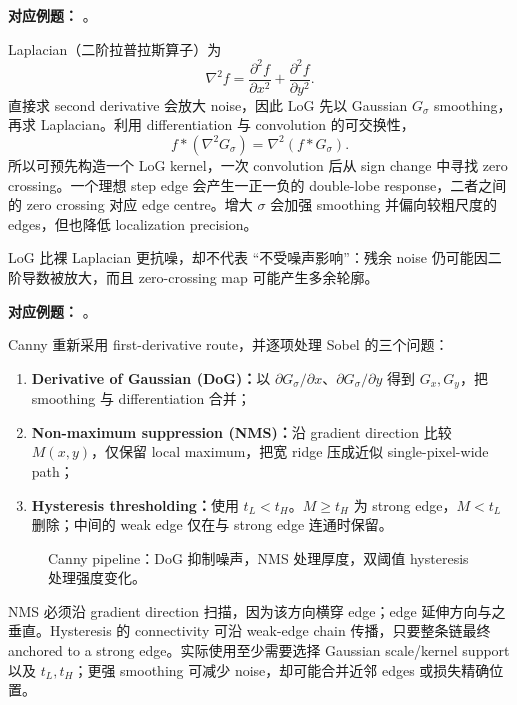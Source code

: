 \textbf{对应例题：}
。


Laplacian（二阶拉普拉斯算子）为
\[
  \nabla^2 f=\frac{\partial^2f}{\partial x^2}+\frac{\partial^2f}{\partial y^2}.
\]
直接求 second derivative 会放大 noise，因此 LoG 先以 Gaussian $G_\sigma$ smoothing，再求 Laplacian。利用 differentiation 与 convolution 的可交换性，
\[
  \boxed{f*(\nabla^2G_\sigma)=\nabla^2(f*G_\sigma)}.
\]
所以可预先构造一个 LoG kernel，一次 convolution 后从 sign change 中寻找 zero crossing。一个理想 step edge 会产生一正一负的 double-lobe response，二者之间的 zero crossing 对应 edge centre。增大 $\sigma$ 会加强 smoothing 并偏向较粗尺度的 edges，但也降低 localization precision。

LoG 比裸 Laplacian 更抗噪，却不代表 ``不受噪声影响''：残余 noise 仍可能因二阶导数被放大，而且 zero-crossing map 可能产生多余轮廓。

\textbf{对应例题：}
。


Canny 重新采用 first-derivative route，并逐项处理 Sobel 的三个问题：
\begin{enumerate}
  \item \textbf{Derivative of Gaussian (DoG)：}以 $\partial G_\sigma/\partial x$、$\partial G_\sigma/\partial y$ 得到 $G_x,G_y$，把 smoothing 与 differentiation 合并；
  \item \textbf{Non-maximum suppression (NMS)：}沿 gradient direction 比较 $M(x,y)$，仅保留 local maximum，把宽 ridge 压成近似 single-pixel-wide path；
  \item \textbf{Hysteresis thresholding：}使用 $t_L<t_H$。$M\ge t_H$ 为 strong edge，$M<t_L$ 删除；中间的 weak edge 仅在与 strong edge 连通时保留。
\end{enumerate}

\begin{figure}[htbp]
  \centering
  \resizebox{0.98\textwidth}{!}{}
  \caption{Canny pipeline：DoG 抑制噪声，NMS 处理厚度，双阈值 hysteresis 处理强度变化。}
  \label{fig:sc4061-l05-canny}
\end{figure}

NMS 必须沿 gradient direction 扫描，因为该方向横穿 edge；edge 延伸方向与之垂直。Hysteresis 的 connectivity 可沿 weak-edge chain 传播，只要整条链最终 anchored to a strong edge。实际使用至少需要选择 Gaussian scale/kernel support 以及 $t_L,t_H$；更强 smoothing 可减少 noise，却可能合并近邻 edges 或损失精确位置。

